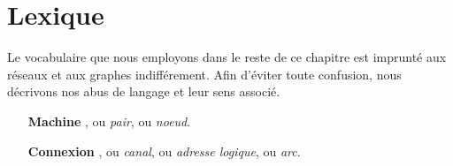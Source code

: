 
\section{Lexique}
\label{net:sec:lexique}

Le vocabulaire que nous employons dans le reste de ce chapitre est imprunté aux
réseaux et aux graphes indifférement. Afin d'éviter toute confusion, nous
décrivons nos abus de langage et leur sens associé.

\begin{itemize}
\item [\textbf{Machine}], ou \emph{pair}, ou \emph{noeud}.
\item [\textbf{Connexion}], ou \emph{canal}, ou \emph{adresse logique}, ou
  \emph{arc}.
\item [\textbf{\TODO{Autre}}]
\end{itemize}
